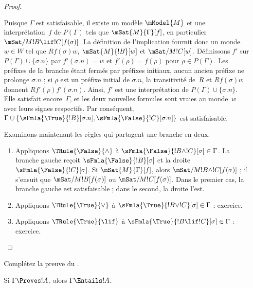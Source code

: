 \documentclass[../../../include/open-logic-section]{subfiles}
\begin{document}
\begin{proof}
\begin{enumerate}
  Puisque $\Gamma$ est satisfaisable, il existe un modèle
  $\mModel{M}$ et une interprétation~$f$ de $P(\Gamma)$ tels que
  $\mSat{M}{\Gamma}[f]$, en particulier
  $\mSat/{M}{!B \lif !C}[f(\sigma)]$. La définition de
  l'implication fournit donc un monde~$w \in W$ tel que
  $Rf(\sigma)w$, $\mSat{M}{!B}[w]$ et
  $\mSat/{M}{!C}[w]$. Définissons $f'$ sur
  $P(\Gamma) \cup \{\sigma.n\}$ par $f'(\sigma.n)=w$ et
  $f'(\rho)=f(\rho)$ pour $\rho\in P(\Gamma)$. Les préfixes de la
  branche étant fermés par préfixes initiaux, aucun ancien préfixe ne
  prolonge $\sigma.n$ ; si $\rho$ est un préfixe initial de
  $\sigma.n$, la transitivité de~$R$ et $Rf(\sigma)w$ donnent
  $Rf'(\rho)f'(\sigma.n)$. Ainsi, $f'$ est une interprétation de
  $P(\Gamma) \cup \{\sigma.n\}$. Elle satisfait encore~$\Gamma$,
  et les deux nouvelles formules sont vraies au monde~$w$ avec leurs
  signes respectifs. Par conséquent,
  $\Gamma \cup \{\sFmla{\True}{!B}[\sigma.n],
  \sFmla{\False}{!C}[\sigma.n]\}$ est satisfaisable.
\end{enumerate}

Examinons maintenant les règles qui partagent une branche en deux.
\begin{enumerate}
\item Appliquons $\TRule{\False}{\land}$ à
  $\sFmla{\False}{!B \land !C}[\sigma] \in \Gamma$. La branche
  gauche reçoit $\sFmla{\False}{!B}[\sigma]$ et la droite
  $\sFmla{\False}{!C}[\sigma]$. Si
  $\mSat{M}{\Gamma}[f]$, alors
  $\mSat/{M}{!B \land !C}[f(\sigma)]$ ; il s'ensuit que
  $\mSat/{M}{!B}[f(\sigma)]$ ou
  $\mSat/{M}{!C}[f(\sigma)]$. Dans le premier cas, la branche
  gauche est satisfaisable ; dans le second, la droite l'est.
\item Appliquons $\TRule{\True}{\lor}$ à
  $\sFmla{\True}{!B \lor !C}[\sigma] \in \Gamma$ : exercice.
\item Appliquons $\TRule{\True}{\lif}$ à
  $\sFmla{\True}{!B \lif !C}[\sigma] \in \Gamma$ : exercice.
\end{enumerate}
\end{proof}

\begin{prob}
Complétez la preuve du
.
\end{prob}

\begin{cor}
Si $\Gamma \Proves !A$, alors $\Gamma \Entails !A$.
\end{cor}
\end{document}
